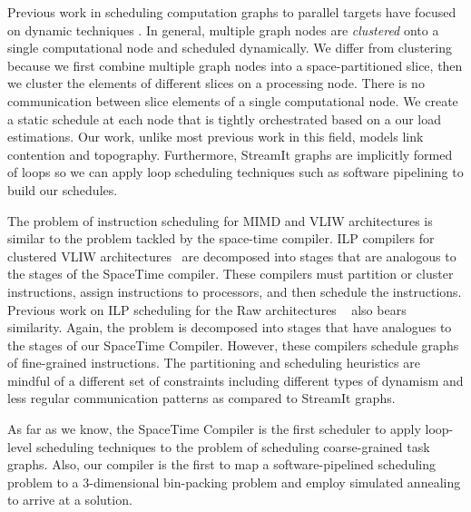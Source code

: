 Previous work in scheduling computation graphs to parallel targets
have focused on dynamic techniques \cite{SDFSched, SDFSched2,
may87communicating, DAGSched}. In general, multiple graph nodes are
{\it clustered} onto a single computational node and scheduled
dynamically.  We differ from clustering because we first combine
multiple graph nodes into a space-partitioned slice, then we cluster
the elements of different slices on a processing node. There is no
communication between slice elements of a single computational node.
We create a static schedule at each node that is tightly orchestrated
based on a our load estimations. Our work, unlike most previous work
in this field, models link contention and topography.  Furthermore,
StreamIt graphs are implicitly formed of loops so we can apply loop
scheduling techniques such as software pipelining to build our
schedules.

The problem of instruction scheduling for MIMD and VLIW architectures
is similar to the problem tackled by the space-time compiler.  ILP
compilers for clustered VLIW architectures~\cite{Bulldog, Multiflow}
are decomposed into stages that are analogous to the stages of the
SpaceTime compiler.  These compilers must partition or cluster
instructions, assign instructions to processors, and then schedule the
instructions.  Previous work on ILP scheduling for the Raw
architectures ~\cite{lee98spacetime} also bears similarity. Again, the
problem is decomposed into stages that have analogues to the stages of
our SpaceTime Compiler.  However, these compilers schedule
graphs of fine-grained instructions. The partitioning and scheduling
heuristics are mindful of a different set of constraints including
different types of dynamism and less regular communication patterns as
compared to StreamIt graphs.

As far as we know, the SpaceTime Compiler is the first scheduler to
apply loop-level scheduling techniques to the problem
of scheduling coarse-grained task graphs.  Also, our compiler is the first
to map a software-pipelined scheduling problem to a 3-dimensional
bin-packing problem and employ simulated annealing to arrive at a solution.

%

